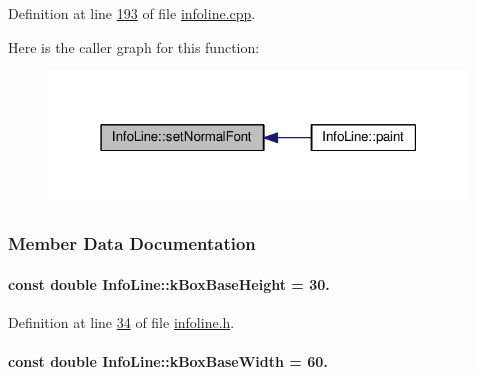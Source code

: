 Definition at line \hyperlink{infoline_8cpp_source_l00193}{193} of file \hyperlink{infoline_8cpp_source}{infoline.\+cpp}.



Here is the caller graph for this function\+:
\nopagebreak
\begin{figure}[H]
\begin{center}
\leavevmode
\includegraphics[width=316pt]{class_info_line_a4d5084d616c878cb717e8445db0023c1_icgraph}
\end{center}
\end{figure}




\subsubsection{Member Data Documentation}
\hypertarget{class_info_line_ab50f47aa54c45def219859e9da3755e6}{}
\paragraph[{k\+Box\+Base\+Height}]{\setlength{\rightskip}{0pt plus 5cm}const double Info\+Line\+::k\+Box\+Base\+Height = 30.\hspace{0.3cm}{\ttfamily [static]}}\label{class_info_line_ab50f47aa54c45def219859e9da3755e6}


Definition at line \hyperlink{infoline_8h_source_l00034}{34} of file \hyperlink{infoline_8h_source}{infoline.\+h}.

\hypertarget{class_info_line_aad905589137b80ba75d9a1c49535eb1a}{}
\paragraph[{k\+Box\+Base\+Width}]{\setlength{\rightskip}{0pt plus 5cm}const double Info\+Line\+::k\+Box\+Base\+Width = 60.\hspace{0.3cm}{\ttfamily [static]}}\label{class_info_line_aad905589137b80ba75d9a1c49535eb1a}


